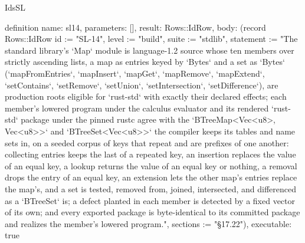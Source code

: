 \begin{lexlean}{IdsSL}
\begin{semanticmodule}
definition{
  name: sl14,
  parameters: [],
  result: Rows::IdRow,
  body: (record Rows::IdRow {id := "SL-14", level := "build", suite := "stdlib", statement := "The standard library's `Map` module is language-1.2 source whose ten members over strictly ascending lists, a map as entries keyed by `Bytes` and a set as `Bytes` (`mapFromEntries`, `mapInsert`, `mapGet`, `mapRemove`, `mapExtend`, `setContains`, `setRemove`, `setUnion`, `setIntersection`, `setDifference`), are production roots eligible for `rust-std` with exactly their declared effects; each member's lowered program under the calculus evaluator and its rendered `rust-std` package under the pinned rustc agree with the `BTreeMap<Vec<u8>, Vec<u8>>` and `BTreeSet<Vec<u8>>` the compiler keeps its tables and name sets in, on a seeded corpus of keys that repeat and are prefixes of one another: collecting entries keeps the last of a repeated key, an insertion replaces the value of an equal key, a lookup returns the value of an equal key or nothing, a removal drops the entry of an equal key, an extension lets the other map's entries replace the map's, and a set is tested, removed from, joined, intersected, and differenced as a `BTreeSet` is; a defect planted in each member is detected by a fixed vector of its own; and every exported package is byte-identical to its committed package and realizes the member's lowered program.", sections := "§17.22"}),
  executable: true
}
\end{semanticmodule}
\end{lexlean}

